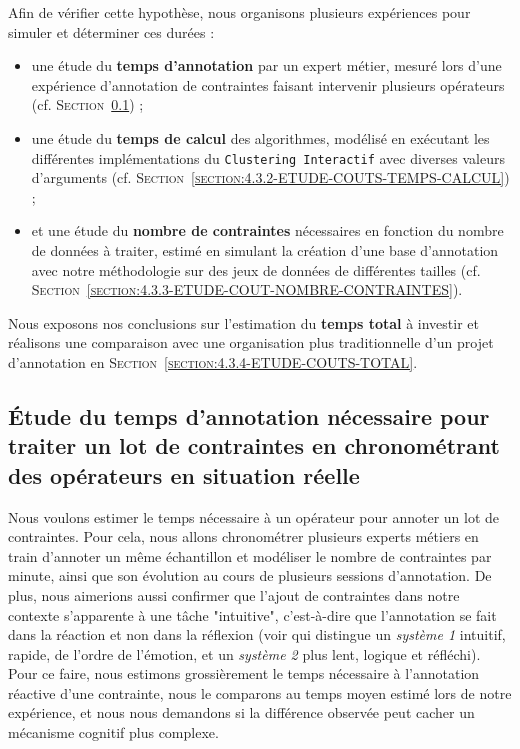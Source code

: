 	Afin de vérifier cette hypothèse, nous organisons plusieurs expériences pour simuler et déterminer ces durées :
	\begin{itemize}
		\item une étude du \textbf{temps d'annotation} par un expert métier, mesuré lors d'une expérience d'annotation de contraintes faisant intervenir plusieurs opérateurs (cf. \textsc{Section~\ref{section:4.3.1-ETUDE-COUTS-TEMPS-ANNOTATION}}) ;
		\item une étude du \textbf{temps de calcul} des algorithmes, modélisé en exécutant les différentes implémentations du \texttt{Clustering Interactif} avec diverses valeurs d'arguments (cf. \textsc{Section~\ref{section:4.3.2-ETUDE-COUTS-TEMPS-CALCUL}}) ;
		\item et une étude du \textbf{nombre de contraintes} nécessaires en fonction du nombre de données à traiter, estimé en simulant la création d'une base d'annotation avec notre méthodologie sur des jeux de données de différentes tailles (cf. \textsc{Section~\ref{section:4.3.3-ETUDE-COUT-NOMBRE-CONTRAINTES}}).
	\end{itemize}
	Nous exposons nos conclusions sur l'estimation du \textbf{temps total} à investir et réalisons une comparaison avec une organisation plus traditionnelle d'un projet d'annotation en \textsc{Section~\ref{section:4.3.4-ETUDE-COUTS-TOTAL}}.
	
	
	\subsection{Étude du temps d'annotation nécessaire pour traiter un lot de contraintes en chronométrant des opérateurs en situation réelle}
	\label{section:4.3.1-ETUDE-COUTS-TEMPS-ANNOTATION}
		
		Nous voulons estimer le temps nécessaire à un opérateur pour annoter un lot de contraintes.
		Pour cela, nous allons chronométrer plusieurs experts métiers en train d'annoter un même échantillon et modéliser le nombre de contraintes par minute, ainsi que son évolution au cours de plusieurs sessions d'annotation.
		De plus, nous aimerions aussi confirmer que l'ajout de contraintes dans notre contexte s'apparente à une tâche "intuitive", c'est-à-dire que l'annotation se fait dans la réaction et non dans la réflexion (voir \cite{kahneman:2011:thinking-fast-slow} qui distingue un \textit{système 1} intuitif, rapide, de l'ordre de l'émotion, et un \textit{système 2} plus lent, logique et réfléchi).
		Pour ce faire, nous estimons grossièrement le temps nécessaire à l'annotation réactive d'une contrainte, nous le comparons au temps moyen estimé lors de notre expérience, et nous nous demandons si la différence observée peut cacher un mécanisme cognitif plus complexe.
	
